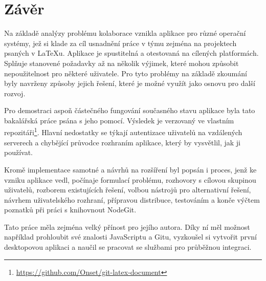 \chapter{Závěr}

Na základě analýzy problému kolaborace vznikla aplikace pro různé operační systémy, jež si klade za cíl usnadnění práce v týmu zejména na projektech psaných v \LaTeX{u}. Aplikace je spustitelná a otestovaná na cílených platformách. Splňuje stanovené požadavky až na několik výjimek, které mohou způsobit nepoužitelnost pro některé uživatele. Pro tyto problémy na základě zkoumání byly navrženy způsoby jejich řešení, které je možné využít jako osnovu pro další rozvoj.

Pro demostraci aspoň částečného fungování současného stavu aplikace byla tato bakalářská práce psána s jeho pomocí. Výsledek je verzovaný ve vlastním repozitáři\footnote{\url{https://github.com/Onset/git-latex-document}}. Hlavní nedostatky se týkají autentizace uživatelů na vzdálených serverech a chybějící průvodce rozhraním aplikace, který by vysvětlil, jak ji používat.

Kromě implementace samotné a návrhů na rozšíření byl popsán i proces, jenž ke vzniku aplikace vedl, počínaje formulací problému, rozhovory s cílovou skupinou uživatelů, rozborem existujících řešení, volbou nástrojů pro alternativní řešení, návrhem uživatelského rozhraní, přípravou distribuce, testováním a konče výčtem poznatků při práci s knihovnout NodeGit.

Tato práce měla zejména velký přínost pro jejího autora. Díky ní měl možnost například prohloubit své znalosti JavaScriptu a Gitu, vyzkoušel si vytvořit první desktopovou aplikaci a naučil se pracovat se službami pro průběžnou integraci.